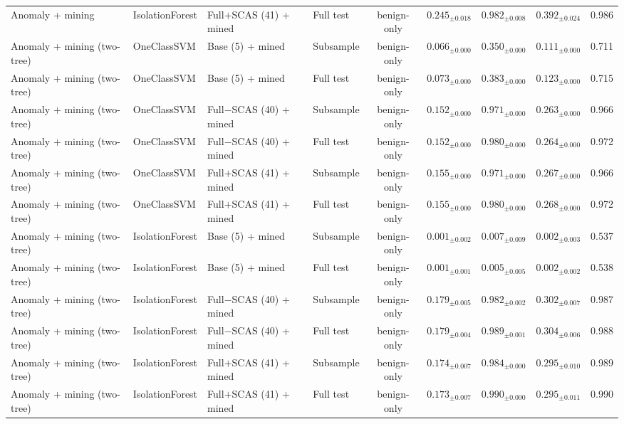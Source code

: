 \begin{longtable}{llllcccc}
\addlinespace
Anomaly + mining & IsolationForest & Full$+$SCAS (41) + mined & Full test & benign-only & $0.245_{\pm 0.018}$ & $0.982_{\pm 0.008}$ & $0.392_{\pm 0.024}$ & 0.986 \\
\addlinespace
Anomaly + mining (two-tree) & OneClassSVM & Base (5) + mined & Subsample & benign-only & $0.066_{\pm 0.000}$ & $0.350_{\pm 0.000}$ & $0.111_{\pm 0.000}$ & 0.711 \\
\addlinespace
Anomaly + mining (two-tree) & OneClassSVM & Base (5) + mined & Full test & benign-only & $0.073_{\pm 0.000}$ & $0.383_{\pm 0.000}$ & $0.123_{\pm 0.000}$ & 0.715 \\
\addlinespace
Anomaly + mining (two-tree) & OneClassSVM & Full$-$SCAS (40) + mined & Subsample & benign-only & $0.152_{\pm 0.000}$ & $0.971_{\pm 0.000}$ & $0.263_{\pm 0.000}$ & 0.966 \\
\addlinespace
Anomaly + mining (two-tree) & OneClassSVM & Full$-$SCAS (40) + mined & Full test & benign-only & $0.152_{\pm 0.000}$ & $0.980_{\pm 0.000}$ & $0.264_{\pm 0.000}$ & 0.972 \\
\addlinespace
Anomaly + mining (two-tree) & OneClassSVM & Full$+$SCAS (41) + mined & Subsample & benign-only & $0.155_{\pm 0.000}$ & $0.971_{\pm 0.000}$ & $0.267_{\pm 0.000}$ & 0.966 \\
\addlinespace
Anomaly + mining (two-tree) & OneClassSVM & Full$+$SCAS (41) + mined & Full test & benign-only & $0.155_{\pm 0.000}$ & $0.980_{\pm 0.000}$ & $0.268_{\pm 0.000}$ & 0.972 \\
\addlinespace
Anomaly + mining (two-tree) & IsolationForest & Base (5) + mined & Subsample & benign-only & $0.001_{\pm 0.002}$ & $0.007_{\pm 0.009}$ & $0.002_{\pm 0.003}$ & 0.537 \\
\addlinespace
Anomaly + mining (two-tree) & IsolationForest & Base (5) + mined & Full test & benign-only & $0.001_{\pm 0.001}$ & $0.005_{\pm 0.005}$ & $0.002_{\pm 0.002}$ & 0.538 \\
\addlinespace
Anomaly + mining (two-tree) & IsolationForest & Full$-$SCAS (40) + mined & Subsample & benign-only & $0.179_{\pm 0.005}$ & $0.982_{\pm 0.002}$ & $0.302_{\pm 0.007}$ & 0.987 \\
\addlinespace
Anomaly + mining (two-tree) & IsolationForest & Full$-$SCAS (40) + mined & Full test & benign-only & $0.179_{\pm 0.004}$ & $0.989_{\pm 0.001}$ & $0.304_{\pm 0.006}$ & 0.988 \\
\addlinespace
Anomaly + mining (two-tree) & IsolationForest & Full$+$SCAS (41) + mined & Subsample & benign-only & $0.174_{\pm 0.007}$ & $0.984_{\pm 0.000}$ & $0.295_{\pm 0.010}$ & 0.989 \\
\addlinespace
Anomaly + mining (two-tree) & IsolationForest & Full$+$SCAS (41) + mined & Full test & benign-only & $0.173_{\pm 0.007}$ & $0.990_{\pm 0.000}$ & $0.295_{\pm 0.011}$ & 0.990 \\
\end{longtable}
